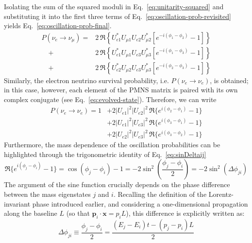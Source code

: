 Isolating the sum of the squared moduli in Eq.~\ref{eq:unitarity-squared} and substituting it into the first three terms of Eq.~\ref{eq:oscillation-prob-revisited} yields Eq.~\ref{eq:oscillation-prob-final}.
\begin{equation}
    \label{eq:oscillation-prob-final}
    \begin{aligned}
        P(\nu_e \to \nu_\mu) = &2\,\Re \left\{ U_{e1}^* U_{\mu 1} U_{e2} U_{\mu 2}^* \left[ e^{-i(\phi_1 - \phi_2)} - 1 \right] \right\} \\
        \quad + &2\,\Re \left\{ U_{e1}^* U_{\mu 1} U_{e3} U_{\mu 3}^* \left[ e^{-i(\phi_1 - \phi_3)} - 1 \right] \right\} \\
        \quad + &2\,\Re \left\{ U_{e2}^* U_{\mu 2} U_{e3} U_{\mu 3}^* \left[ e^{-i(\phi_2 - \phi_3)} - 1 \right] \right\}
    \end{aligned}
\end{equation}
Similarly, the electron neutrino survival probability, i.e. $P(\nu_e \to \nu_e)$, is obtained; in this case, however, 
each element of the PMNS matrix is paired with its own complex conjugate (see Eq.~\ref{eq:evolved-state}).
Therefore, we can write
\begin{equation*}
    \begin{aligned}
    P(\nu_e \to \nu_e) = 1 &+ 2 |U_{e1}|^2|U_{e2}|^2 \,\Re\{e^{i(\phi_2-\phi_1)}-1\}\\
                           &+ 2 |U_{e1}|^2|U_{e3}|^2 \,\Re\{e^{i(\phi_3-\phi_1)}-1\}\\
                           &+ 2 |U_{e2}|^2|U_{e3}|^2 \,\Re\{e^{i(\phi_3-\phi_2)}-1\}
    \end{aligned}
\end{equation*}
Furthermore, the mass dependence of the oscillation probabilities can be highlighted through the trigonometric identity of Eq.~\ref{eq:sinDeltaij}
\begin{equation}
    \label{eq:sinDeltaij}
    \Re\{e^{i(\phi_j-\phi_i)}-1\} = \cos(\phi_j-\phi_i) - 1 = -2 \sin^2\left(\frac{\phi_j-\phi_i}{2}\right) = -2 \sin^2(\Delta \phi_{ji})
\end{equation}
The argument of the sine function crucially depends on the phase difference between the mass eigenstates $j$ and $i$. 
Recalling the definition of the Lorentz-invariant phase introduced earlier, and considering a one-dimensional propagation along the baseline 
$L$ (so that $\mathbf{p}_i \cdot \mathbf{x} = p_i L$), this difference is explicitly written as:
\begin{equation}
    \label{eq:phase-diff-general}
    \Delta\phi_{ji} \equiv \frac{\phi_j - \phi_i}{2} = \frac{(E_j - E_i)t - (p_j - p_i)L}{2}
\end{equation}

